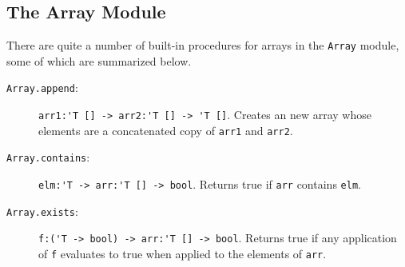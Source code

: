\subsection{The Array Module}
There are quite a number of built-in procedures for arrays in the \lstinline{Array} module, some of which are summarized below.
\begin{description}
\item[\texttt{Array.append}:] \lstinline{arr1:'T [] -> arr2:'T [] -> 'T []}. Creates an new array whose elements are a concatenated copy of \lstinline{arr1} and \lstinline{arr2}.
\item[\texttt{Array.contains}:] \lstinline{elm:'T -> arr:'T [] -> bool}. Returns true if \lstinline{arr} contains \lstinline{elm}.
\item[\texttt{Array.exists}:] \lstinline{f:('T -> bool) -> arr:'T [] -> bool}. Returns true if any application of \lstinline{f} evaluates to true when applied to the elements of \lstinline{arr}.

\end{description}
